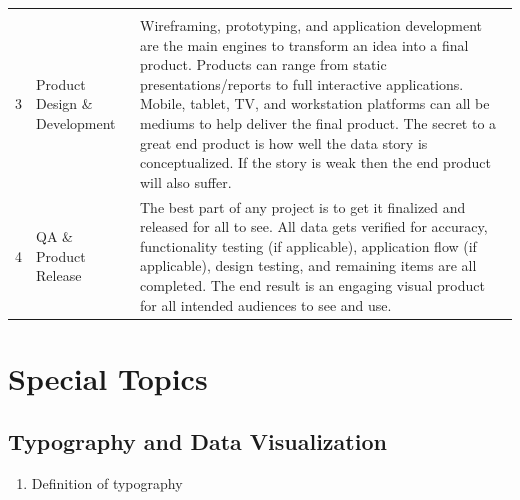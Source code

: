 \documentclass[]{book}
\providecommand{\tightlist}{%
  \setlength{\itemsep}{0pt}\setlength{\parskip}{0pt}}
\begin{document}
\begin{longtable}[]{@{}lll@{}}
\begin{minipage}[t]{0.76\columnwidth}
\end{minipage}\tabularnewline
\begin{minipage}[t]{0.04\columnwidth}\raggedright
3\strut
\end{minipage} & \begin{minipage}[t]{0.11\columnwidth}\raggedright
Product Design \& Development\strut
\end{minipage} & \begin{minipage}[t]{0.76\columnwidth}\raggedright
Wireframing, prototyping, and application development are the main engines to transform an idea into a final product. Products can range from static presentations/reports to full interactive applications. Mobile, tablet, TV, and workstation platforms can all be mediums to help deliver the final product. The secret to a great end product is how well the data story is conceptualized. If the story is weak then the end product will also suffer.\strut
\end{minipage}\tabularnewline
\begin{minipage}[t]{0.04\columnwidth}\raggedright
4\strut
\end{minipage} & \begin{minipage}[t]{0.11\columnwidth}\raggedright
QA \& Product Release\strut
\end{minipage} & \begin{minipage}[t]{0.76\columnwidth}\raggedright
The best part of any project is to get it finalized and released for all to see. All data gets verified for accuracy, functionality testing (if applicable), application flow (if applicable), design testing, and remaining items are all completed. The end result is an engaging visual product for all intended audiences to see and use.\strut
\end{minipage}\tabularnewline
\bottomrule
\end{longtable}

\hypertarget{special-topics-1}{%
\section{Special Topics}\label{special-topics-1}}

\hypertarget{typography-and-data-visualization}{%
\subsection{Typography and Data Visualization}\label{typography-and-data-visualization}}

\begin{enumerate}
\def\labelenumi{\arabic{enumi}.}
\tightlist
\item
  Definition of typography
\end{enumerate}
\end{document}
